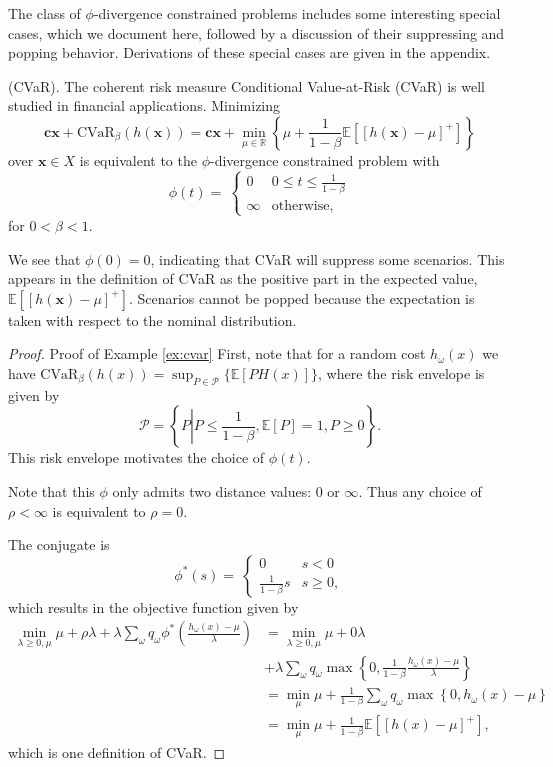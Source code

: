 \documentclass[12pt]{article}
\newcommand{\R}{{\mathbb{R}}}
\newcommand{\E}{\mathbb{E}}
\newcommand{\e}[1]{\E \left[ #1 \right]}
\newcommand{\x}{\mathbf{x}}
\renewcommand{\c}{\mathbf{c}}
\theoremstyle{plain}
\theoremstyle{definition}
\theoremstyle{remark}
\begin{document}
The class of $\phi$-divergence constrained problems includes some interesting special cases, which we document here, followed by a discussion of their suppressing and popping behavior.
Derivations of these special cases are given in the appendix.

\begin{example}{(CVaR).}
	\label{ex:cvar}
	The coherent risk measure Conditional Value-at-Risk (CVaR) is well studied in financial applications.
	Minimizing
	\[
		\c\x + \text{CVaR}_\beta(h(\x)) = \c\x + \min_{\mu \in \R} \left\{ \mu + \frac{1}{1-\beta}\e{\left[h(\x)-\mu\right]^+} \right\}
	\]
	over $\x \in X$ is equivalent to the $\phi$-divergence constrained problem with
	\[
		\phi(t) = \
		\begin{cases}
			0 & 0 \leq t \leq \frac{1}{1-\beta} \\
			\infty & \text{otherwise},
		\end{cases}
	\]
	for $0 < \beta < 1$.

	We see that $\phi(0) = 0$, indicating that CVaR will suppress some scenarios.
	This appears in the definition of CVaR as the positive part in the expected value, $\e{[h(\x)-\mu]^+}$.
	Scenarios cannot be popped because the expectation is taken with respect to the nominal distribution.
\end{example}

\begin{proof}{\sc Proof of Example \ref{ex:cvar}}
	First, note that for a random cost $h_\omega(x)$ we have $\mbox{CVaR}_\beta(h(x)) = \sup_{P \in \mathcal{P}} \{\e{PH(x)}\}$, where the risk envelope is given by
	\[
		\mathcal{P} = \left\{ P \left| P \leq \frac{1}{1-\beta}, \e{P} = 1, P \geq 0 \right.\right\}.
	\]
	This risk envelope motivates the choice of $\phi(t)$.
	
	Note that this $\phi$ only admits two distance values: $0$ or $\infty$.
	Thus any choice of $\rho < \infty$ is equivalent to $\rho = 0$.
	
	The conjugate is
	\[
	\phi^*(s) = \
		\begin{cases}
			0 & s < 0 \\
			\frac{1}{1-\beta} s & s \geq 0,
		\end{cases}
	\]
	which results in the objective function given by
	\begin{align*}
		\min_{\lambda \geq 0,\mu} \mu + \rho \lambda + \lambda \sum_\omega q_\omega \phi^*\left( \frac{h_\omega(x)-\mu}{\lambda} \right) & = \min_{\lambda \geq 0, \mu} \mu + 0\lambda \\
		& + \lambda \sum_\omega q_\omega \max\left\{ 0, \frac{1}{1-\beta} \frac{h_\omega(x)-\mu}{\lambda} \right\} \\
		& = \min_{\mu} \mu + \frac{1}{1-\beta} \sum_\omega q_\omega \max\left\{ 0, h_\omega(x)-\mu \right\} \\
		& = \min_{\mu} \mu + \frac{1}{1-\beta} \e{[h(x)-\mu]^+},
	\end{align*}
	which is one definition of CVaR.
\end{proof}
\end{document}
